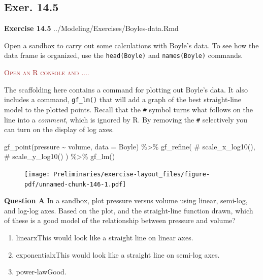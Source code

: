 \documentclass[
  letterpaper,
  DIV=11,
  numbers=noendperiod,
  oneside]{article}
\newenvironment{Shaded}{\begin{snugshade}}{\end{snugshade}}
\newcommand{\AttributeTok}[1]{\textcolor[rgb]{0.40,0.45,0.13}{#1}}
\newcommand{\CommentTok}[1]{\textcolor[rgb]{0.37,0.37,0.37}{#1}}
\newcommand{\FunctionTok}[1]{\textcolor[rgb]{0.28,0.35,0.67}{#1}}
\newcommand{\NormalTok}[1]{\textcolor[rgb]{0.00,0.23,0.31}{#1}}
\newcommand{\SpecialCharTok}[1]{\textcolor[rgb]{0.37,0.37,0.37}{#1}}
\providecommand{\tightlist}{%
  \setlength{\itemsep}{0pt}\setlength{\parskip}{0pt}}\usepackage{longtable,booktabs,array}
\newenvironment{scaffolding}%
{%
\textcolor{brown}{\hrulefill}%
  \par\vspace{.3\baselineskip}%
  \textcolor{brown}{\scshape Open an R console and ....}%
  \par\vspace{\baselineskip}%
}%
{\textcolor{brown}{\hrulefill}}
\begin{document}
\begin{multicols}{2}
\hypertarget{exer.-14.5}{%
\section*{Exer. 14.5}\label{exer.-14.5}}

\textbf{Exercise 14.5} ../Modeling/Exercises/Boyles-data.Rmd

Open a sandbox to carry out some calculations with Boyle's data. To see
how the data frame is organized, use the \texttt{head(Boyle)} and
\texttt{names(Boyle)} commands.

\begin{scaffolding}

The scaffolding here contains a command for plotting out Boyle's data.
It also includes a command, \texttt{gf\_lm()} that will add a graph of
the best straight-line model to the plotted points. Recall that the
\texttt{\#} symbol turns what follows on the line into a \emph{comment},
which is ignored by R. By removing the \texttt{\#} selectively you can
turn on the display of log axes.

\begin{Shaded}
\begin{Highlighting}[]
\FunctionTok{gf\_point}\NormalTok{(pressure }\SpecialCharTok{\textasciitilde{}}\NormalTok{ volume, }\AttributeTok{data =}\NormalTok{ Boyle) }\SpecialCharTok{\%\textgreater{}\%}
  \FunctionTok{gf\_refine}\NormalTok{(}
     \CommentTok{\# scale\_x\_log10(),}
     \CommentTok{\# scale\_y\_log10()}
\NormalTok{  ) }\SpecialCharTok{\%\textgreater{}\%}
  \FunctionTok{gf\_lm}\NormalTok{()}
\end{Highlighting}
\end{Shaded}

\begin{figure}[H]

{\centering \texttt{[image: Preliminaries/exercise-layout\_files/figure-pdf/unnamed-chunk-146-1.pdf]}

}

\end{figure}

\end{scaffolding}

\textbf{Question A} In a sandbox, plot pressure versus volume using
linear, semi-log, and log-log axes. Based on the plot, and the
straight-line function drawn, which of these is a good model of the
relationship between pressure and volume?

\begin{enumerate}
\def\labelenumi{\roman{enumi}.}
\tightlist
\item
  {linear{xThis would look like a straight line on linear axes.}}\\
\item
  {exponential{xThis would look like a straight line on semi-log
  axes.}}\\
\item
  {power-law{Good.~}}
\end{enumerate}


\end{multicols}
\end{document}
